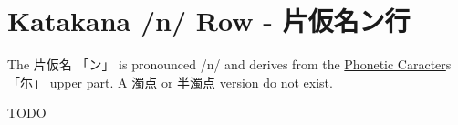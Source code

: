 \section{Katakana /n/ Row - 片仮名ン行}\label{sec:KatakanaNrow}


 The  片仮名 {「ン」} is pronounced  /n/ and  derives from the
\hyperref[sec:PhoneticCharacter]{Phonetic Caracter}s {「尓」} upper part.  A
\hyperref[sec:Dakuten]{濁点} or \hyperref[sec:Handakuten]{半濁点} version do
not exist.



\newpage

TODO
\newpage

%
%
%
%
%


